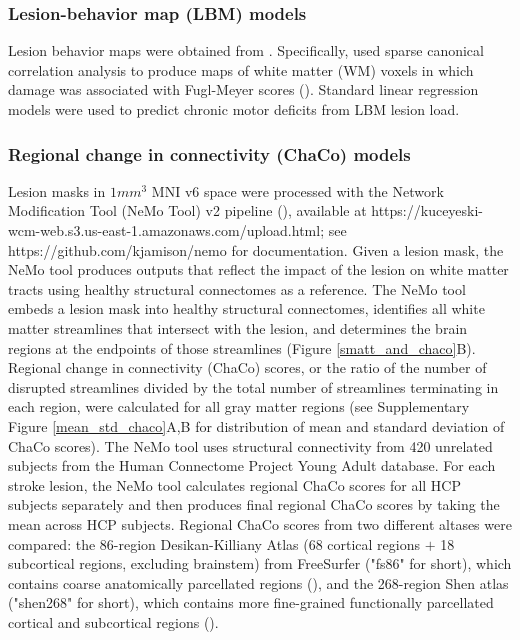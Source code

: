\documentclass[10pt]{article}
\def\Plus{\texttt{+}}
\begin{document}
\subsubsection*{Lesion-behavior map (LBM) models}
Lesion behavior maps were obtained from \cite{Bowren2022-rs}. Specifically, \cite{Bowren2022-rs} used sparse canonical correlation analysis to produce maps of white matter (WM) voxels in which damage was associated with Fugl-Meyer scores (\cite{Pustina2018-xv}). Standard linear regression models were used to predict chronic motor deficits from LBM lesion load. 

\subsubsection*{Regional change in connectivity (ChaCo) models}
Lesion masks in $1mm^3$ MNI v6 space were processed with the Network Modification Tool (NeMo Tool) v2 pipeline (\cite{Kuceyeski2013-nk}), available at https://kuceyeski-wcm-web.s3.us-east-1.amazonaws.com/upload.html; see https://github.com/kjamison/nemo for documentation. Given a lesion mask, the NeMo tool produces outputs that reflect the impact of the lesion on white matter tracts using healthy structural connectomes as a reference. The NeMo tool embeds a lesion mask into healthy structural connectomes, identifies all white matter streamlines that intersect with the lesion, and determines the brain regions at the endpoints of those streamlines (Figure \ref{smatt_and_chaco}B). Regional change in connectivity (ChaCo) scores, or the ratio of the number of disrupted streamlines divided by the total number of streamlines terminating in each region, were calculated for all gray matter regions (see Supplementary Figure \ref{mean_std_chaco}A,B for distribution of mean and standard deviation of ChaCo scores). The NeMo tool uses structural connectivity from 420 unrelated subjects from the Human Connectome Project Young Adult database. For each stroke lesion, the NeMo tool calculates regional ChaCo scores for all HCP subjects separately and then produces final regional ChaCo scores by taking the mean across HCP subjects. Regional ChaCo scores from two different altases were compared: the 86-region Desikan-Killiany Atlas (68 cortical regions $\Plus$ 18 subcortical regions, excluding brainstem) from FreeSurfer ("fs86" for short), which contains coarse anatomically parcellated regions (\cite{Desikan2006-vf,Fischl2002-lb}), and the 268-region Shen atlas ("shen268" for short), which contains more fine-grained functionally parcellated cortical and subcortical regions (\cite{Shen2013-zn}).
\end{document}
